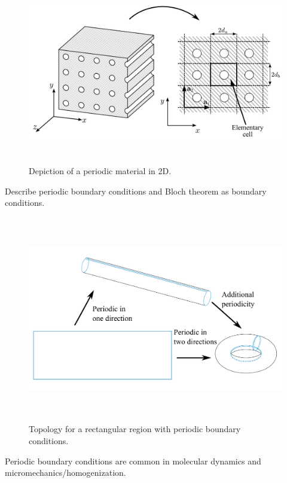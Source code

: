\begin{figure}[h]
\centering
\includegraphics[height=8cm]{img/periodic_2D.pdf} 
\caption{Depiction of a periodic material in 2D.}
\label{fig:periodic_2D}
\end{figure}

 Describe periodic boundary conditions and Bloch theorem as boundary conditions.

\begin{figure}[h]
\centering
\includegraphics[height=9cm]{img/periodic_topology.pdf} 
\caption{Topology for a rectangular region with periodic boundary conditions.}
\label{fig:periodic_topo}
\end{figure}

Periodic boundary conditions are common in molecular dynamics and micromechanics/homogenization.


